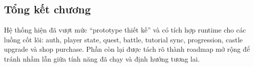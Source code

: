 \subsection{Tổng kết chương}
\label{subsec:impl-summary}

Hệ thống hiện đã vượt mức ``prototype thiết kế'' và có tích hợp runtime cho các luồng cốt lõi: auth, player state, quest, battle, tutorial sync, progression, castle upgrade và shop purchase. Phần còn lại được tách rõ thành roadmap mở rộng để tránh nhầm lẫn giữa tính năng đã chạy và định hướng tương lai.
